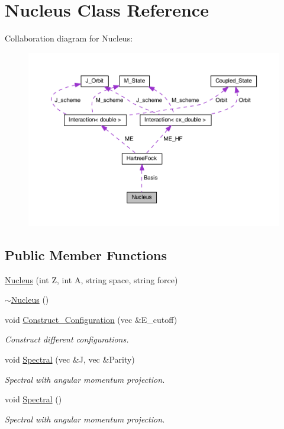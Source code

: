 \hypertarget{class_nucleus}{\section{Nucleus Class Reference}
\label{class_nucleus}
}


Collaboration diagram for Nucleus\-:
\nopagebreak
\begin{figure}[H]
\begin{center}
\leavevmode
\includegraphics[width=350pt]{class_nucleus__coll__graph}
\end{center}
\end{figure}
\subsection*{Public Member Functions}
\begin{DoxyCompactItemize}
\item 
\hyperlink{class_nucleus_aa51f8aa0e853d8c58c8bbf7e56eb93f9}{Nucleus} (int Z, int A, string space, string force)
\item 
\hyperlink{class_nucleus_a012f1716baa1cf5317e6fc0e06c44647}{$\sim$\-Nucleus} ()
\item 
void \hyperlink{class_nucleus_a5f953c3273fccb833c90c929e6c991a2}{Construct\-\_\-\-Configuration} (vec \&E\-\_\-cutoff)
\begin{DoxyCompactList}\small\item\em Construct different configurations. \end{DoxyCompactList}\item 
void \hyperlink{class_nucleus_a5e449f1e876db72824f9466131becac0}{Spectral} (vec \&J, vec \&Parity)
\begin{DoxyCompactList}\small\item\em Spectral with angular momentum projection. \end{DoxyCompactList}\item 
void \hyperlink{class_nucleus_a2f41a5f6ec0546ec57736d5f0bad6e17}{Spectral} ()
\begin{DoxyCompactList}\small\item\em Spectral with angular momentum projection. \end{DoxyCompactList}\end{DoxyCompactItemize}
